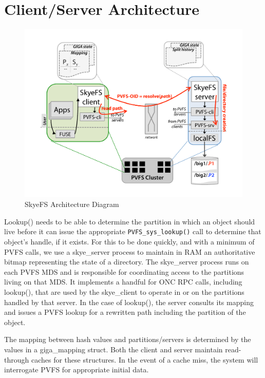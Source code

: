 \documentclass[letterpaper]{article}
\newcommand{\code}[1]{\texttt{#1}}
\begin{document}
\section{Client/Server Architecture}
\begin{figure}
\begin{center}
\includegraphics[scale=0.4]{figure-architecture}
\end{center}
\caption{SkyeFS Architecture Diagram}
\end{figure}
Lookup() needs to be able to determine the partition in which an object should
live before it can issue the appropriate \code{PVFS\_\-sys\_\-lookup()} call to determine
that object's handle, if it exists.  For this to be done quickly, and with a
minimum of PVFS calls, we use a skye\_\-server process to maintain in RAM an
authoritative bitmap representing the state of a directory.  The skye\_\-server
process runs on each PVFS MDS and is responsible for coordinating access to the
partitions living on that MDS.  It implements a handful for ONC RPC calls,
including lookup(), that are used by the skye\_\-client to operate in or on the
partitions handled by that server.  In the case of lookup(), the server consults
its mapping and issues a PVFS lookup for a rewritten path including the
partition of the object.

The mapping between hash values and partitions/servers is determined by the
values in a giga\_\-mapping struct.  Both the client and server maintain
read-through caches for these structures.  In the event of a cache miss, the
system will interrogate PVFS for appropriate initial data.
\end{document}

